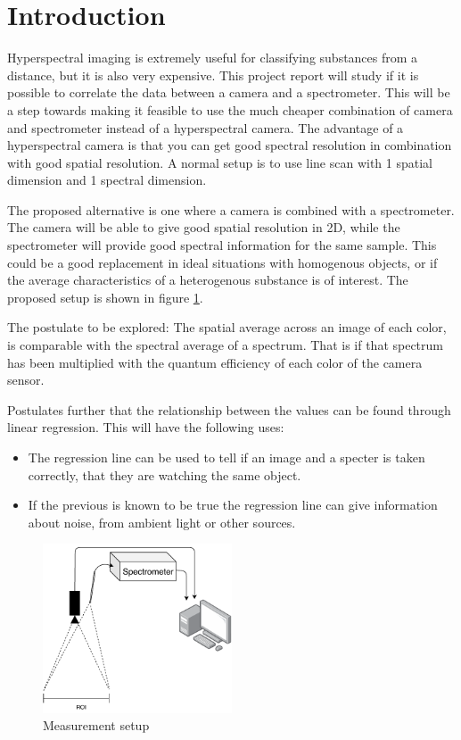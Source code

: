 \section{Introduction}
\label{sec:introduction}
Hyperspectral imaging is extremely useful for classifying substances from a distance, but it is also very expensive. This project report will study if it is possible to correlate the data between a camera and a spectrometer. This will be a step towards making it feasible to use the much cheaper combination of camera and spectrometer instead of a hyperspectral camera. The advantage of a hyperspectral camera is that you can get good spectral resolution in combination with good spatial resolution. A normal setup is to use line scan with 1 spatial dimension and 1 spectral dimension.

The proposed alternative is one where a camera is combined with a spectrometer. The camera will be able to give good spatial resolution in 2D, while the spectrometer will provide good spectral information for the same sample. This could be a good replacement in ideal situations with homogenous objects, or if the average characteristics of a heterogenous substance is of interest. The proposed setup is shown in figure \ref{fig:measurement_setup}. 

The postulate to be explored: 
The spatial average across an image of each color, is comparable with the spectral average of a spectrum. That is if that spectrum has been multiplied with the quantum efficiency of each color of the camera sensor. 

Postulates further that the relationship between the values can be found through linear regression. This will have the following uses: 
\begin{itemize}
    \item The regression line can be used to tell if an image and a specter is taken correctly, that they are watching the same object. 
    \item If the previous is known to be true the regression line can give information about noise, from ambient light or other sources. 
\end{itemize}


\begin{figure}[h]
    \centering
    \includegraphics[width=0.5\textwidth]{figures/pt_setup.pdf}
    \caption{Measurement setup}
    \label{fig:measurement_setup}
\end{figure}

